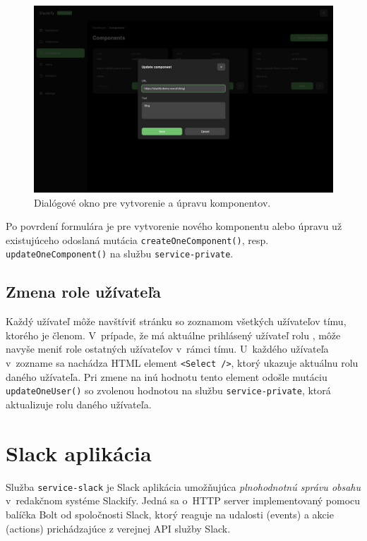 \begin{figure}[H]
	\centering
	\includegraphics[scale=0.085]{obrazky-figures/screenshot_component_update}
	\caption{Dialógové okno pre vytvorenie a úpravu komponentov.}
\end{figure}

\noindent Po povrdení formulára je pre vytvorenie nového komponentu alebo úpravu už existujúceho odoslaná mutácia \texttt{createOneComponent()}, resp. \texttt{updateOneComponent()} na službu \texttt{service-private}.

\subsection{Zmena role užívateľa}
Každý užívateľ môže navštíviť stránku so zoznamom všetkých užívateľov tímu, ktorého je členom. V~prípade, že má aktuálne prihlásený užívateľ rolu , môže navyše meniť role ostatných užívateľov v~rámci tímu. U~každého užívateľa v~zozname sa nachádza HTML element \texttt{<Select />}, ktorý ukazuje aktuálnu rolu daného užívateľa. Pri zmene na inú hodnotu tento element odošle mutáciu \texttt{updateOneUser()} so zvolenou hodnotou na službu \texttt{service-private}, ktorá aktualizuje rolu daného užívateľa.

\section{Slack aplikácia}
\label{impl:slack_app}
Služba \texttt{service-slack} je Slack aplikácia umožňujúca \emph{plnohodnotnú správu obsahu} v~redakčnom systéme Slackify. Jedná sa o~HTTP server implementovaný pomocu balíčka Bolt od spoločnosti Slack, ktorý reaguje na udalosti (events) a akcie (actions) prichádzajúce z verejnej API služby Slack.


